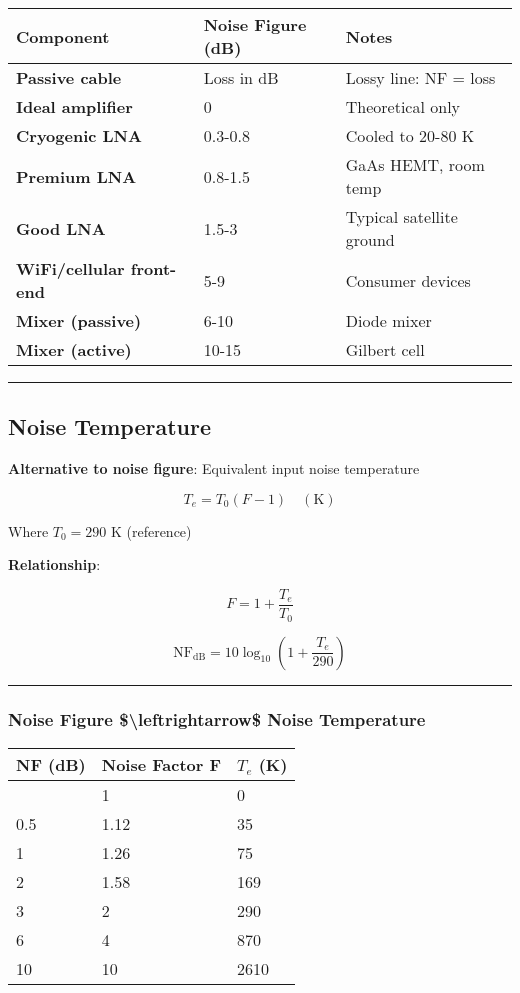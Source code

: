 {\def\LTcaptype{} %
\begin{longtable}[]{@{}lll@{}}
\toprule\noalign{}
Component & Noise Figure (dB) & Notes \\
\midrule\noalign{}
\endhead
\bottomrule\noalign{}
\endlastfoot
\textbf{Passive cable} & Loss in dB & Lossy line: NF = loss \\
\textbf{Ideal amplifier} & 0 & Theoretical only \\
\textbf{Cryogenic LNA} & 0.3-0.8 & Cooled to 20-80 K \\
\textbf{Premium LNA} & 0.8-1.5 & GaAs HEMT, room temp \\
\textbf{Good LNA} & 1.5-3 & Typical satellite ground \\
\textbf{WiFi/cellular front-end} & 5-9 & Consumer devices \\
\textbf{Mixer (passive)} & 6-10 & Diode mixer \\
\textbf{Mixer (active)} & 10-15 & Gilbert cell \\
\end{longtable}
}

\begin{center}\rule{0.5\linewidth}{0.5pt}\end{center}

\subsection{Noise Temperature}\label{noise-temperature}

\textbf{Alternative to noise figure}: Equivalent input noise temperature

\[
T_e = T_0 (F - 1) \quad (\text{K})
\]

Where \(T_0 = 290\) K (reference)

\textbf{Relationship}:

\[
F = 1 + \frac{T_e}{T_0}
\]

\[
\text{NF}_{\text{dB}} = 10\log_{10}\left(1 + \frac{T_e}{290}\right)
\]

\begin{center}\rule{0.5\linewidth}{0.5pt}\end{center}

\subsubsection{Noise Figure \$\textbackslash leftrightarrow\$ Noise
Temperature}\label{noise-figure-noise-temperature}

{\def\LTcaptype{} %
\begin{longtable}[]{@{}lll@{}}
\toprule\noalign{}
NF (dB) & Noise Factor F & \(T_e\) (K) \\
\midrule\noalign{}
\endhead
\bottomrule\noalign{}
\endlastfoot
0 & 1 & 0 \\
0.5 & 1.12 & 35 \\
1 & 1.26 & 75 \\
2 & 1.58 & 169 \\
3 & 2 & 290 \\
6 & 4 & 870 \\
10 & 10 & 2610 \\
\end{longtable}
}

